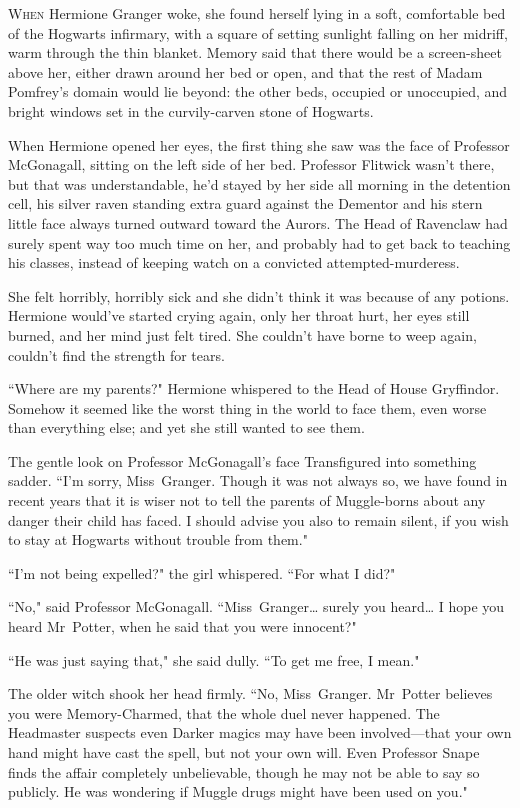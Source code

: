 
\lettrine{W}{hen} Hermione Granger woke, she found herself lying in a soft, comfortable bed of the Hogwarts infirmary, with a square of setting sunlight falling on her midriff, warm through the thin blanket. Memory said that there would be a screen-sheet above her, either drawn around her bed or open, and that the rest of Madam Pomfrey's domain would lie beyond: the other beds, occupied or unoccupied, and bright windows set in the curvily-carven stone of Hogwarts.

When Hermione opened her eyes, the first thing she saw was the face of Professor McGonagall, sitting on the left side of her bed. Professor Flitwick wasn't there, but that was understandable, he'd stayed by her side all morning in the detention cell, his silver raven standing extra guard against the Dementor and his stern little face always turned outward toward the Aurors. The Head of Ravenclaw had surely spent way too much time on her, and probably had to get back to teaching his classes, instead of keeping watch on a convicted attempted-murderess.

She felt horribly, horribly sick and she didn't think it was because of any potions. Hermione would've started crying again, only her throat hurt, her eyes still burned, and her mind just felt tired. She couldn't have borne to weep again, couldn't find the strength for tears.

``Where are my parents?" Hermione whispered to the Head of House Gryffindor. Somehow it seemed like the worst thing in the world to face them, even worse than everything else; and yet she still wanted to see them.

The gentle look on Professor McGonagall's face Transfigured into something sadder. ``I'm sorry, Miss~Granger. Though it was not always so, we have found in recent years that it is wiser not to tell the parents of Muggle-borns about any danger their child has faced. I should advise you also to remain silent, if you wish to stay at Hogwarts without trouble from them."

``I'm not being expelled?" the girl whispered. ``For what I did?"

``No," said Professor McGonagall. ``Miss~Granger{\ldots} surely you heard{\ldots} I hope you heard Mr~Potter, when he said that you were innocent?"

``He was just saying that," she said dully. ``To get me free, I mean."

The older witch shook her head firmly. ``No, Miss~Granger. Mr~Potter believes you were Memory-Charmed, that the whole duel never happened. The Headmaster suspects even Darker magics may have been involved—that your own hand might have cast the spell, but not your own will. Even Professor Snape finds the affair completely unbelievable, though he may not be able to say so publicly. He was wondering if Muggle drugs might have been used on you."


